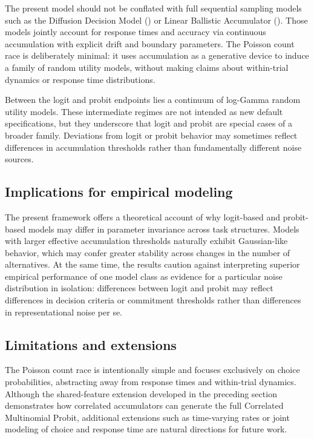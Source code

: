\documentclass[
  man,
  floatsintext,
  longtable,
  a4paper,
  nolmodern,
  notxfonts,
  notimes,
  colorlinks=true,linkcolor=blue,citecolor=blue,urlcolor=blue]{apa7}
\begin{document}
The present model should not be conflated with full sequential sampling
models such as the Diffusion Decision Model
() or
Linear Ballistic Accumulator
(). Those models jointly account for response times and accuracy via
continuous accumulation with explicit drift and boundary parameters. The
Poisson count race is deliberately minimal: it uses accumulation as a
generative device to induce a family of random utility models, without
making claims about within-trial dynamics or response time
distributions.

Between the logit and probit endpoints lies a continuum of log-Gamma
random utility models. These intermediate regimes are not intended as
new default specifications, but they underscore that logit and probit
are special cases of a broader family. Deviations from logit or probit
behavior may sometimes reflect differences in accumulation thresholds
rather than fundamentally different noise sources.

\subsection{Implications for empirical
modeling}\label{implications-for-empirical-modeling}

The present framework offers a theoretical account of why logit-based
and probit-based models may differ in parameter invariance across task
structures. Models with larger effective accumulation thresholds
naturally exhibit Gaussian-like behavior, which may confer greater
stability across changes in the number of alternatives. At the same
time, the results caution against interpreting superior empirical
performance of one model class as evidence for a particular noise
distribution in isolation: differences between logit and probit may
reflect differences in decision criteria or commitment thresholds rather
than differences in representational noise per se.

\subsection{Limitations and
extensions}\label{limitations-and-extensions}

The Poisson count race is intentionally simple and focuses exclusively
on choice probabilities, abstracting away from response times and
within-trial dynamics. Although the shared-feature extension developed
in the preceding section demonstrates how correlated accumulators can
generate the full Correlated Multinomial Probit, additional extensions
such as time-varying rates or joint modeling of choice and response time
are natural directions for future work.
\end{document}
